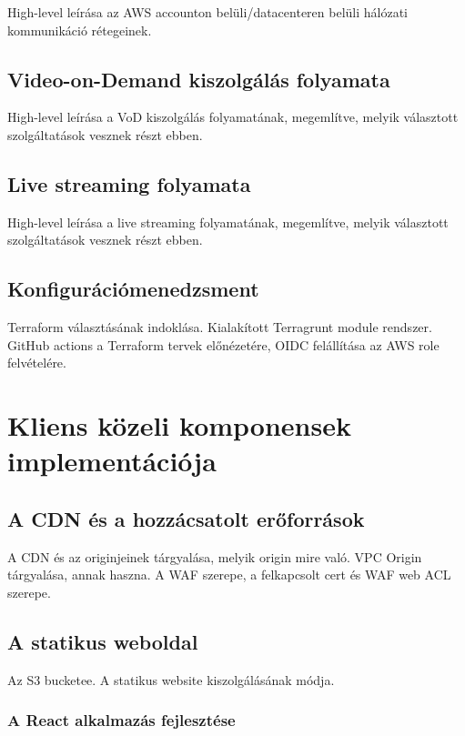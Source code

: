 High-level leírása az AWS accounton belüli/datacenteren belüli hálózati kommunikáció rétegeinek.

\section{Video-on-Demand kiszolgálás folyamata}

High-level leírása a VoD kiszolgálás folyamatának, megemlítve, melyik választott szolgáltatások vesznek részt ebben.

\section{Live streaming folyamata}

High-level leírása a live streaming folyamatának, megemlítve, melyik választott szolgáltatások vesznek részt ebben.

\section{Konfigurációmenedzsment}

Terraform választásának indoklása. Kialakított Terragrunt module rendszer. GitHub actions a Terraform tervek előnézetére, OIDC felállítása az AWS role felvételére.

\chapter{Kliens közeli komponensek implementációja}

\section{A CDN és a hozzácsatolt erőforrások}

A CDN és az originjeinek tárgyalása, melyik origin mire való. VPC Origin tárgyalása, annak haszna. A WAF szerepe, a felkapcsolt cert és WAF web ACL szerepe.

\section{A statikus weboldal}

Az S3 bucketee. A statikus website kiszolgálásának módja.

\subsection{A React alkalmazás fejlesztése}

